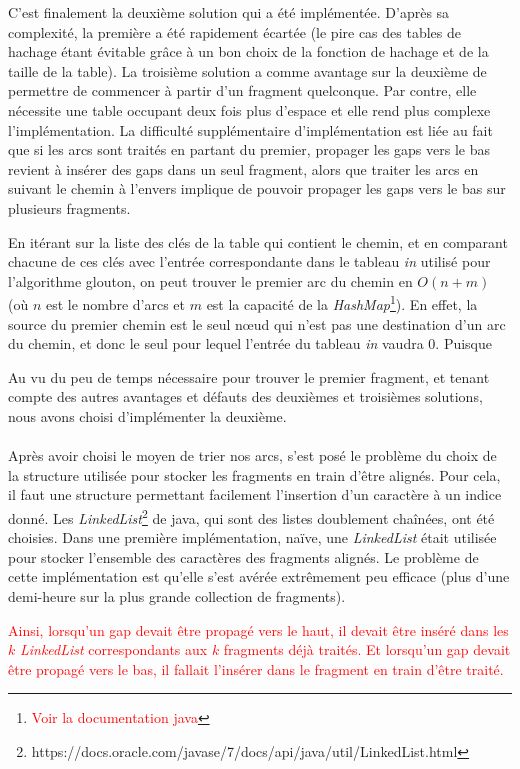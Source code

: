 \documentclass{article}
\begin{document}
C'est finalement la deuxième solution qui a été implémentée. D'après sa complexité, la première a été rapidement écartée (le pire cas des tables de hachage étant évitable grâce à un bon choix de la fonction de hachage et de la taille de la table). 
La troisième solution a comme avantage sur la deuxième de permettre de commencer à partir d'un fragment quelconque. Par contre, elle nécessite une table occupant deux fois plus d'espace et elle rend plus complexe l'implémentation. La difficulté supplémentaire d'implémentation est liée au fait que si les arcs sont traités en partant du premier, propager les gaps vers le bas revient à insérer des gaps dans un seul fragment, alors que traiter les arcs en suivant le chemin à l'envers implique de pouvoir propager les gaps vers le bas sur plusieurs fragments.

En itérant sur la liste des clés de la table qui contient le chemin, et en comparant chacune de ces clés avec l'entrée correspondante dans le tableau \textit{in} utilisé pour l'algorithme glouton, on peut trouver le premier arc du chemin en $O(n+m)$ (où $n$ est le nombre d'arcs et $m$ est la capacité de la \textit{HashMap}\footnote{\textcolor{red}{Voir la documentation java}}). En effet, la source du premier chemin est le seul nœud qui n'est pas une destination d'un arc du chemin, et donc le seul pour lequel l'entrée du tableau \textit{in} vaudra $0$. Puisque 

Au vu du peu de temps nécessaire pour trouver le premier fragment, et tenant compte des autres avantages et défauts des deuxièmes et troisièmes solutions, nous avons choisi d'implémenter la deuxième.
\\~\\ 
 
Après avoir choisi le moyen de trier nos arcs, s'est posé le problème du choix de la structure utilisée pour stocker les fragments en train d'être alignés. Pour cela, il faut une structure permettant facilement l'insertion d'un caractère à un indice donné. Les \textit{LinkedList}\footnote{https://docs.oracle.com/javase/7/docs/api/java/util/LinkedList.html} de java, qui sont des listes doublement chaînées, ont été choisies. Dans une première implémentation, naïve, une \textit{LinkedList} était utilisée pour stocker l'ensemble des caractères des fragments alignés. 
Le problème de cette implémentation est qu'elle s'est avérée extrêmement peu efficace (plus d'une demi-heure sur la plus grande collection de fragments). 

\textcolor{red}{
Ainsi, lorsqu'un gap devait être propagé vers le haut, il devait être inséré dans les $k$ \textit{LinkedList} correspondants aux $k$ fragments déjà traités. Et lorsqu'un gap devait être propagé vers le bas, il fallait l'insérer dans le fragment en train d'être traité.}
\end{document}
